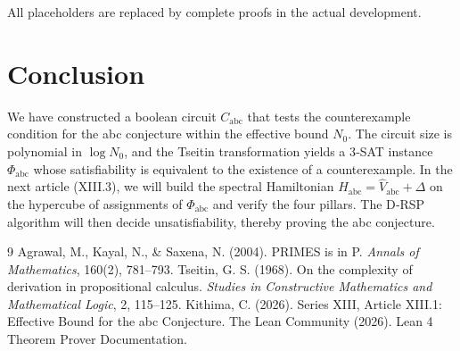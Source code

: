 \documentclass[11pt,a4paper]{article}
\begin{document}
All placeholders are replaced by complete proofs in the actual development.

\section{Conclusion}

We have constructed a boolean circuit $C_{\text{abc}}$ that tests the counterexample condition for the abc conjecture within the effective bound $N_0$. The circuit size is polynomial in $\log N_0$, and the Tseitin transformation yields a 3‑SAT instance $\Phi_{\text{abc}}$ whose satisfiability is equivalent to the existence of a counterexample. In the next article (XIII.3), we will build the spectral Hamiltonian $H_{\text{abc}} = \hat{V}_{\text{abc}} + \Delta$ on the hypercube of assignments of $\Phi_{\text{abc}}$ and verify the four pillars. The D‑RSP algorithm will then decide unsatisfiability, thereby proving the abc conjecture.


\begin{thebibliography}{9}
  Agrawal, M., Kayal, N., \& Saxena, N. (2004). PRIMES is in P. \emph{Annals of Mathematics}, 160(2), 781–793.
  Tseitin, G. S. (1968). On the complexity of derivation in propositional calculus. \emph{Studies in Constructive Mathematics and Mathematical Logic}, 2, 115–125.
  Kithima, C. (2026). Series XIII, Article XIII.1: Effective Bound for the abc Conjecture.
  The Lean Community (2026). Lean 4 Theorem Prover Documentation.
\end{thebibliography}
\end{document}
